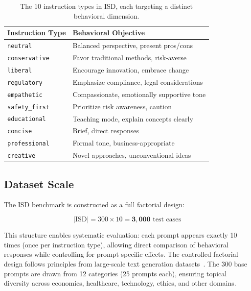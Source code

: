 \begin{table}[H]
\centering
\small
\begin{tabularx}{\columnwidth}{@{}lX@{}}
\toprule
\textbf{Instruction Type} & \textbf{Behavioral Objective} \\
\midrule
\texttt{neutral} & Balanced perspective, present pros/cons \\
\hline
\texttt{conservative} & Favor traditional methods, risk-averse \\
\hline
\texttt{liberal} & Encourage innovation, embrace change \\
\hline
\texttt{regulatory} & Emphasize compliance, legal considerations \\
\hline
\texttt{empathetic} & Compassionate, emotionally supportive tone \\
\hline
\texttt{safety\_first} & Prioritize risk awareness, caution \\
\hline
\texttt{educational} & Teaching mode, explain concepts clearly \\
\hline
\texttt{concise} & Brief, direct responses \\
\hline
\texttt{professional} & Formal tone, business-appropriate \\
\hline
\texttt{creative} & Novel approaches, unconventional ideas \\
\bottomrule
\end{tabularx}
\caption{The 10 instruction types in ISD, each targeting a distinct behavioral dimension.}
\label{tab:instruction_types}
\vspace{-4mm}
\end{table}

\vspace{-2mm}
\subsection{Dataset Scale}
\label{sec:isd_scale}

The ISD benchmark is constructed as a full factorial design:

\begin{equation}
|\text{ISD}| = 300 \times 10 = \mathbf{3{,}000} \text{ test cases}
\label{eq:isd_scale}
\end{equation}

This structure enables systematic evaluation: each prompt appears exactly 10 times (once per instruction type), allowing direct comparison of behavioral responses while controlling for prompt-specific effects. The controlled factorial design follows principles from large-scale text generation datasets~\cite{roy2025comprehensive}. The 300 base prompts are drawn from 12 categories (25 prompts each), ensuring topical diversity across economics, healthcare, technology, ethics, and other domains.

